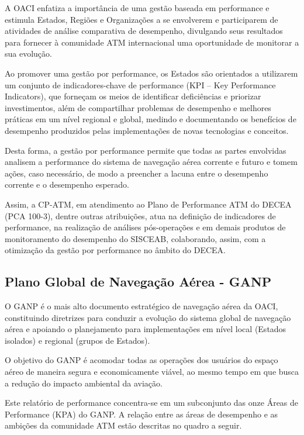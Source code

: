 \documentclass[
]{book}
\theoremstyle{definition}
\theoremstyle{definition}
\theoremstyle{definition}
\theoremstyle{definition}
\theoremstyle{remark}
\begin{document}
A OACI enfatiza a importância de uma gestão baseada em performance e estimula Estados, Regiões e Organizações a se envolverem e participarem de atividades de análise comparativa de desempenho, divulgando seus resultados para fornecer à comunidade ATM internacional uma oportunidade de monitorar a sua evolução.

Ao promover uma gestão por performance, os Estados são orientados a utilizarem um conjunto de indicadores-chave de performance (KPI -- Key Performance Indicators), que forneçam os meios de identificar deficiências e priorizar investimentos, além de compartilhar problemas de desempenho e melhores práticas em um nível regional e global, medindo e documentando os benefícios de desempenho produzidos pelas implementações de novas tecnologias e conceitos.

Desta forma, a gestão por performance permite que todas as partes envolvidas analisem a performance do sistema de navegação aérea corrente e futuro e tomem ações, caso necessário, de modo a preencher a lacuna entre o desempenho corrente e o desempenho esperado.

Assim, a CP-ATM, em atendimento ao Plano de Performance ATM do DECEA (PCA 100-3), dentre outras atribuições, atua na definição de indicadores de performance, na realização de análises pós-operações e em demais produtos de monitoramento do desempenho do SISCEAB, colaborando, assim, com a otimização da gestão por performance no âmbito do DECEA.

\hypertarget{plano-global-de-navegauxe7uxe3o-auxe9rea---ganp}{%
\subsection{Plano Global de Navegação Aérea - GANP}\label{plano-global-de-navegauxe7uxe3o-auxe9rea---ganp}}

O GANP é o mais alto documento estratégico de navegação aérea da OACI, constituindo diretrizes para conduzir a evolução do sistema global de navegação aérea e apoiando o planejamento para implementações em nível local (Estados isolados) e regional (grupos de Estados).

O objetivo do GANP é acomodar todas as operações dos usuários do espaço aéreo de maneira segura e economicamente viável, ao mesmo tempo em que busca a redução do impacto ambiental da aviação.

Este relatório de performance concentra-se em um subconjunto das onze Áreas de Performance (KPA) do GANP. A relação entre as áreas de desempenho e as ambições da comunidade ATM estão descritas no quadro a seguir.
\end{document}
